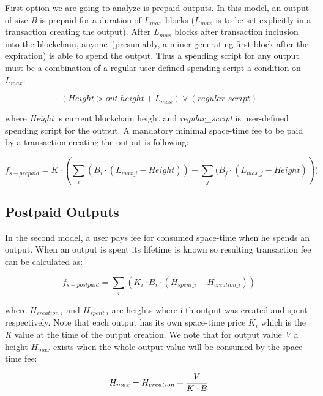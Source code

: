 \documentclass[]{llncs}   %
\newcommand{\authnote}[2]{\marginpar{\parbox{\marginparwidth}{\tiny %
  \textsf{#1 {\textcolor{blue}{notes: #2}}}}}%
  \textcolor{blue}{\textbf{\dag}}}
\newcommand{\authnote}[2]{
  \textsf{#1 \textcolor{blue}{: #2}}}
\newcommand{\authnote}[2]{}
\newcommand{\knote}[1]{{\authnote{\textcolor{green}{Alex notes}}{#1}}}
\begin{document}
First option we are going to analyze is prepaid outputs. In this model, an output of size \textit{B} is prepaid for a duration of $L_{max}$ blocks ($L_{max}$ is to be set explicitly in a transaction creating the output). After $L_{max}$ blocks after transaction inclusion into the blockchain, anyone~(presumably, a miner generating first block after the expiration) is able to spend the output. Thus a spending script for any output must be a combination of a regular user-defined spending script a condition on $L_{max}$:

\begin{equation}
(Height > out.height + L_{max}) \lor (regular\_script)
\end{equation}

where \textit{Height} is current blockchain height and {\em regular\_script} is user-defined spending script for the output. A mandatory minimal space-time fee to be paid by a transaction creating the output is following:

\begin{equation}
f_{s-prepaid} = K \cdot (\sum_i{(B_i \cdot (L_{max\_i} - Height))} - \sum_j{(B_j \cdot (L_{max\_j} - Height)}))
\end{equation}

\knote{Height is subjective here, write about that}

\subsection{Postpaid Outputs}
\label{sec-postpaid}

In the second model, a user pays fee for consumed space-time when he spends an output. When an output is spent its lifetime is known so resulting transaction fee can be calculated as:

\begin{equation}
f_{s-postpaid} = \sum_i{(K_i \cdot B_i \cdot (H_{spent\_i} - H_{creation\_i}))}
\end{equation}

where $H_{creation\_i}$ and $H_{spent\_i}$ are heights where i-th output was created and spent respectively. Note that each output has its own space-time price \textit{$K_i$} which is the \textit{K} value at the time of the output creation. We note that for output value \textit{V} a height \textit{$H_{max}$} exists when the whole output value will be consumed by the space-time fee:

\begin{equation}
H_{max} = {H_{creation} + {V \over {K \cdot B}}}
\end{equation}
\end{document}

